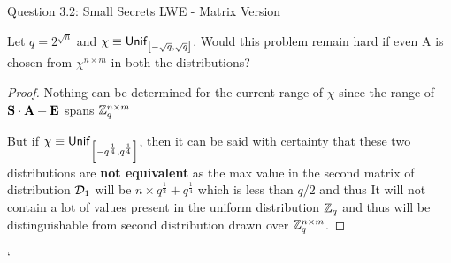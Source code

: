 \begin{solution}{Question 3.2: Small Secrets LWE - Matrix Version}\label{ques:32}
    \begin{question}
    Let $q = 2^{\sqrt{n}}$ and $\chi \equiv \mathsf{Unif}_{\left[-\sqrt{q}, \sqrt{q}\right]}$. Would this problem remain hard if even A is chosen from $\chi^{n \times m}$ in both the distributions?
    \end{question}
    \tcblower{}
    \begin{proof}
    Nothing can be determined for the current range of $\chi$ since the range of $\mathbf{S}\cdot\mathbf{A}+\mathbf{E}$ spans $\mathbb{Z}_q^{n\times m}$
    
    But if $\chi \equiv \mathsf{Unif}_{\left[-q^\frac{1}{4}, q^\frac{1}{4}\right]}$, then it can be said with certainty that these two distributions are \textbf{not equivalent} as the max value in the second matrix of distribution $\mathcal{D}_1$ will be $n\times q^{\frac{1}{2}} + q^{\frac{1}{4}}$ which is less than $q/2$ and thus It will not contain a lot of values present in the uniform distribution $\mathbb{Z}_q$ and thus will be distinguishable from second distribution drawn over $\mathbb{Z}_q^{n \times m}$.
    \end{proof}
\end{solution}` 
